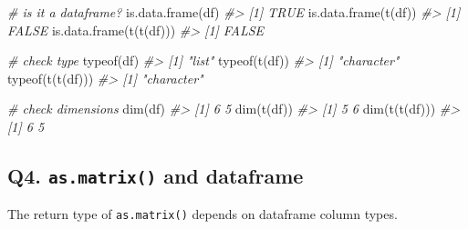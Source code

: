 \documentclass[
]{book}
\newenvironment{Shaded}{\begin{snugshade}}{\end{snugshade}}
\newcommand{\CommentTok}[1]{\textcolor[rgb]{0.56,0.35,0.01}{\textit{#1}}}
\newcommand{\FunctionTok}[1]{\textcolor[rgb]{0.00,0.00,0.00}{#1}}
\newcommand{\NormalTok}[1]{#1}
\begin{document}
\begin{Shaded}
\begin{Highlighting}[]
\CommentTok{\# is it a dataframe?}
\FunctionTok{is.data.frame}\NormalTok{(df)}
\CommentTok{\#\textgreater{} [1] TRUE}
\FunctionTok{is.data.frame}\NormalTok{(}\FunctionTok{t}\NormalTok{(df))}
\CommentTok{\#\textgreater{} [1] FALSE}
\FunctionTok{is.data.frame}\NormalTok{(}\FunctionTok{t}\NormalTok{(}\FunctionTok{t}\NormalTok{(df)))}
\CommentTok{\#\textgreater{} [1] FALSE}

\CommentTok{\# check type}
\FunctionTok{typeof}\NormalTok{(df)}
\CommentTok{\#\textgreater{} [1] "list"}
\FunctionTok{typeof}\NormalTok{(}\FunctionTok{t}\NormalTok{(df))}
\CommentTok{\#\textgreater{} [1] "character"}
\FunctionTok{typeof}\NormalTok{(}\FunctionTok{t}\NormalTok{(}\FunctionTok{t}\NormalTok{(df)))}
\CommentTok{\#\textgreater{} [1] "character"}

\CommentTok{\# check dimensions}
\FunctionTok{dim}\NormalTok{(df)}
\CommentTok{\#\textgreater{} [1] 6 5}
\FunctionTok{dim}\NormalTok{(}\FunctionTok{t}\NormalTok{(df))}
\CommentTok{\#\textgreater{} [1] 5 6}
\FunctionTok{dim}\NormalTok{(}\FunctionTok{t}\NormalTok{(}\FunctionTok{t}\NormalTok{(df)))}
\CommentTok{\#\textgreater{} [1] 6 5}
\end{Highlighting}
\end{Shaded}

\hypertarget{q4.-as.matrix-and-dataframe}{%
\subsection*{\texorpdfstring{Q4. \texttt{as.matrix()} and dataframe}{Q4. as.matrix() and dataframe}}\label{q4.-as.matrix-and-dataframe}}

The return type of \texttt{as.matrix()} depends on dataframe column types.
\end{document}
